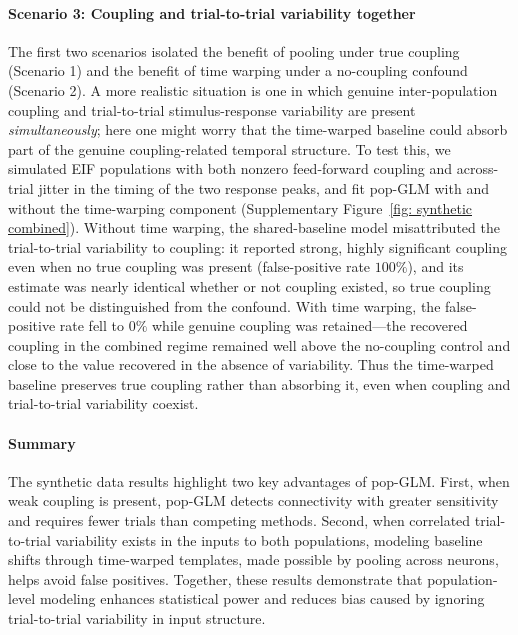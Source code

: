 \documentclass[12pt]{article}
\begin{document}
\paragraph{Scenario 3: Coupling and trial-to-trial variability together}
The first two scenarios isolated the benefit of pooling under true coupling (Scenario 1) and the benefit of time warping under a no-coupling confound (Scenario 2). A more realistic situation is one in which genuine inter-population coupling and trial-to-trial stimulus-response variability are present \emph{simultaneously}; here one might worry that the time-warped baseline could absorb part of the genuine coupling-related temporal structure. To test this, we simulated EIF populations with both nonzero feed-forward coupling and across-trial jitter in the timing of the two response peaks, and fit pop-GLM with and without the time-warping component (Supplementary Figure~\ref{fig: synthetic combined}). Without time warping, the shared-baseline model misattributed the trial-to-trial variability to coupling: it reported strong, highly significant coupling even when no true coupling was present (false-positive rate $100\%$), and its estimate was nearly identical whether or not coupling existed, so true coupling could not be distinguished from the confound. With time warping, the false-positive rate fell to $0\%$ while genuine coupling was retained---the recovered coupling in the combined regime remained well above the no-coupling control and close to the value recovered in the absence of variability. Thus the time-warped baseline preserves true coupling rather than absorbing it, even when coupling and trial-to-trial variability coexist.

\paragraph{Summary}
The synthetic data results highlight two key advantages of pop-GLM. First, when weak coupling is present, pop-GLM detects connectivity with greater sensitivity and requires fewer trials than competing methods. Second, when correlated trial-to-trial variability exists in the inputs to both populations, modeling baseline shifts through time-warped templates, made possible by pooling across neurons, helps avoid false positives. Together, these results demonstrate that population-level modeling enhances statistical power and reduces bias caused by ignoring trial-to-trial variability in input structure.
\end{document}
